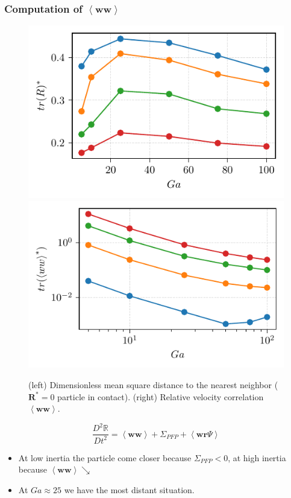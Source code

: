 \documentclass{sintefbeamer}
\newcommand{\avg}[1]{\left<#1\right>}
\newcommand{\condavg}[2]{\overline{#1}^{#2}}
\newcommand{\pddt}{\partial_t}
\begin{document}
\begin{frame}
  \frametitle{Computation of $\avg{\textbf{ww}}$}
  \begin{figure}
    \includegraphics[height=0.23\textwidth]{image/HOMOGENEOUS/fPA/RR.pdf}
    \includegraphics[height=0.23\textwidth]{image/HOMOGENEOUS/fPA/trWW.pdf}
    \caption{ 
      (left) Dimensionless  mean square distance to the nearest neighbor ($\textbf{R}^* =0$ particle in contact). 
      (right) Relative velocity correlation  $\avg{\textbf{ww}}$.
      }
  \end{figure}
  \begin{equation*}
    \frac{D^2 \mathbb{R}}{Dt^2}
  = \avg{\textbf{w}\textbf{w}}
  + \Sigma_{PFP}
  + \avg{\textbf{w}\textbf{r}\Psi}
\end{equation*}
  
  
\begin{itemize}
  \item At low inertia the particle come closer because $\Sigma_{PFP}<0$, at high inertia because $\avg{\textbf{ww}} \searrow$
  \item At $Ga \approx 25$ we have the most distant situation. 
\end{itemize}

\end{frame}




\end{document}
